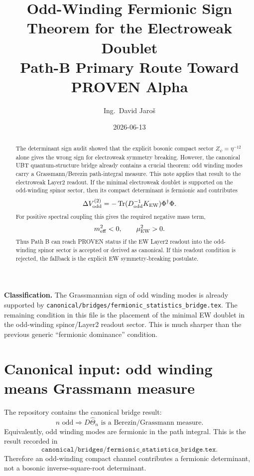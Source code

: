 \documentclass[12pt,a4paper]{article}
\title{Odd-Winding Fermionic Sign Theorem for the Electroweak Doublet\\
       \large Path-B Primary Route Toward PROVEN Alpha}
\author{Ing.\ David Jaro\v{s}}
\date{2026-06-13}
\begin{document}
\maketitle
\fi

\begin{abstract}
The determinant sign audit showed that the explicit bosonic compact sector
$Z_\psi=\eta^{-12}$ alone gives the wrong sign for electroweak symmetry
breaking.  However, the canonical UBT quantum-structure bridge already contains
a crucial theorem: odd winding modes carry a Grassmann/Berezin path-integral
measure.  This note applies that result to the electroweak Layer2 readout.  If
the minimal electroweak doublet is supported on the odd-winding spinor sector,
then its compact determinant is fermionic and contributes
\[
  \Delta V_{\rm odd}^{(2)}
  =
  -\operatorname{Tr}(D_{\rm odd}^{-1}K_{\rm EW})\Phi^\dagger\Phi.
\]
For positive spectral coupling this gives the required negative mass term,
\[
  m_{\rm eff}^2<0,
  \qquad
  \mu_{\rm EW}^2>0.
\]
Thus Path B can reach PROVEN status if the EW Layer2 readout into the odd-winding
spinor sector is accepted or derived as canonical.  If this readout condition is
rejected, the fallback is the explicit EW symmetry-breaking postulate.
\end{abstract}

\begin{statusbox}
\textbf{Classification.} The Grassmannian sign of odd winding modes is already
supported by \texttt{canonical/bridges/fermionic\_statistics\_bridge.tex}.  The
remaining condition in this file is the placement of the minimal EW doublet in
the odd-winding spinor/Layer2 readout sector.  This is much sharper than the
previous generic ``fermionic dominance'' condition.
\end{statusbox}

\section{Canonical input: odd winding means Grassmann measure}

The repository contains the canonical bridge result:
\[
  n\text{ odd}
  \Longrightarrow
  D\hat\Theta_n\text{ is a Berezin/Grassmann measure.}
\]
Equivalently, odd winding modes are fermionic in the path integral.  This is the
result recorded in
\[
  \texttt{canonical/bridges/fermionic\_statistics\_bridge.tex}.
\]
Therefore an odd-winding compact channel contributes a fermionic determinant,
not a bosonic inverse-square-root determinant.
\end{document}
